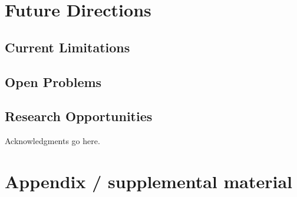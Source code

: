 \documentclass{article}
\begin{document}
\section{Future Directions}
\subsection{Current Limitations}
\subsection{Open Problems}
\subsection{Research Opportunities}

\begin{ack}
Acknowledgments go here.
\end{ack}

\small





\appendix

\section{Appendix / supplemental material}


\newpage
\end{document}
